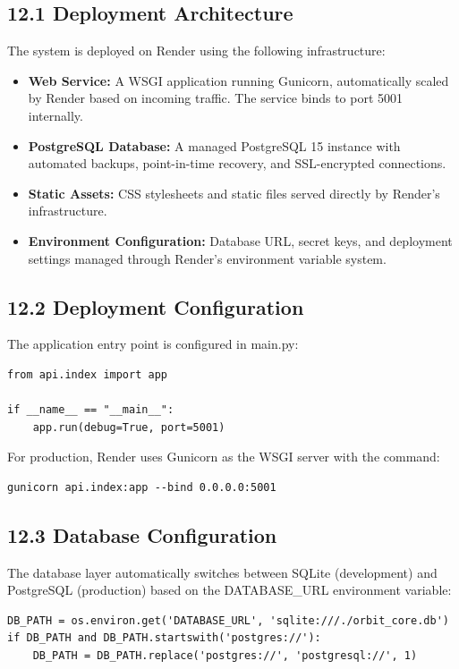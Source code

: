 ﻿\documentclass[12pt]{article}
\begin{document}
\subsection*{12.1 Deployment Architecture}
The system is deployed on Render using the following infrastructure:
\begin{itemize}
\item \textbf{Web Service:} A WSGI application running Gunicorn, automatically scaled by Render based on incoming traffic. The service binds to port 5001 internally.
\item \textbf{PostgreSQL Database:} A managed PostgreSQL 15 instance with automated backups, point-in-time recovery, and SSL-encrypted connections.
\item \textbf{Static Assets:} CSS stylesheets and static files served directly by Render's infrastructure.
\item \textbf{Environment Configuration:} Database URL, secret keys, and deployment settings managed through Render's environment variable system.
\end{itemize}

\subsection*{12.2 Deployment Configuration}
The application entry point is configured in main.py:

\begin{lstlisting}[style=pycode]
from api.index import app

if __name__ == "__main__":
    app.run(debug=True, port=5001)
\end{lstlisting}

For production, Render uses Gunicorn as the WSGI server with the command:
\begin{lstlisting}[style=pycode]
gunicorn api.index:app --bind 0.0.0.0:5001
\end{lstlisting}

\subsection*{12.3 Database Configuration}
The database layer automatically switches between SQLite (development) and PostgreSQL (production) based on the DATABASE\_URL environment variable:

\begin{lstlisting}[style=pycode]
DB_PATH = os.environ.get('DATABASE_URL', 'sqlite:///./orbit_core.db')
if DB_PATH and DB_PATH.startswith('postgres://'):
    DB_PATH = DB_PATH.replace('postgres://', 'postgresql://', 1)
\end{lstlisting}
\end{document}
